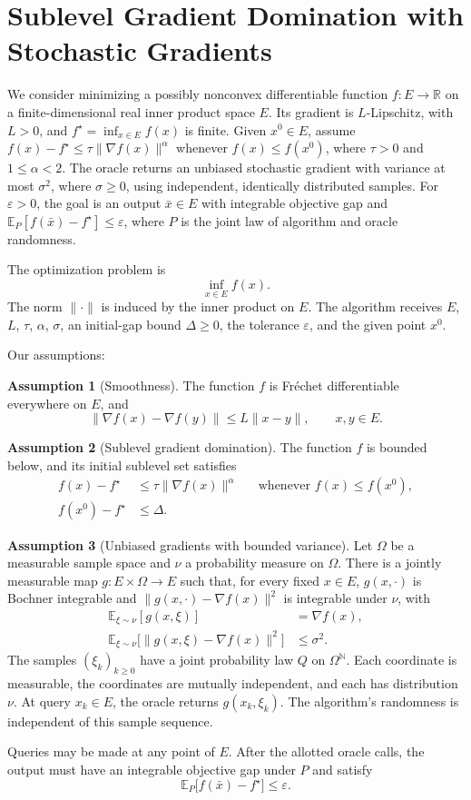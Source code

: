\documentclass[10pt]{article}
\theoremstyle{definition}
\newtheorem{assumption}{Assumption}
\begin{document}
\section*{Sublevel Gradient Domination with Stochastic Gradients}
We consider minimizing a possibly nonconvex differentiable function $f:E\to\mathbb{R}$ on a finite-dimensional real inner product space $E$. Its gradient is $L$-Lipschitz, with $L>0$, and $f^\star=\inf_{x\in E}f(x)$ is finite. Given $x^0\in E$, assume $f(x)-f^\star\leq\tau\|\nabla f(x)\|^\alpha$ whenever $f(x)\leq f(x^0)$, where $\tau>0$ and $1\leq\alpha<2$. The oracle returns an unbiased stochastic gradient with variance at most $\sigma^2$, where $\sigma\geq0$, using independent, identically distributed samples. For $\varepsilon>0$, the goal is an output $\bar{x}\in E$ with integrable objective gap and $\mathbb{E}_{P}[f(\bar{x})-f^\star]\leq\varepsilon$, where $P$ is the joint law of algorithm and oracle randomness.

The optimization problem is
\[
\inf_{x\in E} f(x).
\]
The norm $\|\cdot\|$ is induced by the inner product on $E$. The algorithm receives $E$, $L$, $\tau$, $\alpha$, $\sigma$, an initial-gap bound $\Delta\geq0$, the tolerance $\varepsilon$, and the given point $x^0$.

Our assumptions:
\begin{assumption}[Smoothness]
The function $f$ is Fr\'echet differentiable everywhere on $E$, and
\[
\|\nabla f(x)-\nabla f(y)\|\leq L\|x-y\|,
\qquad x,y\in E.
\]
\end{assumption}

\begin{assumption}[Sublevel gradient domination]
The function $f$ is bounded below, and its initial sublevel set satisfies
\[
\begin{aligned}
f(x)-f^\star&\leq\tau\|\nabla f(x)\|^\alpha
&&\text{whenever }f(x)\leq f(x^0),\\
f(x^0)-f^\star&\leq\Delta.
\end{aligned}
\]
\end{assumption}

\begin{assumption}[Unbiased gradients with bounded variance]
Let $\Omega$ be a measurable sample space and $\nu$ a probability measure on $\Omega$. There is a jointly measurable map $g:E\times\Omega\to E$ such that, for every fixed $x\in E$, $g(x,\cdot)$ is Bochner integrable and $\|g(x,\cdot)-\nabla f(x)\|^2$ is integrable under $\nu$, with
\[
\begin{aligned}
\mathbb{E}_{\xi\sim\nu}[g(x,\xi)]&=\nabla f(x),\\
\mathbb{E}_{\xi\sim\nu}
\bigl[\|g(x,\xi)-\nabla f(x)\|^2\bigr]&\leq\sigma^2.
\end{aligned}
\]
The samples $(\xi_k)_{k\geq0}$ have a joint probability law $Q$ on $\Omega^{\mathbb{N}}$. Each coordinate is measurable, the coordinates are mutually independent, and each has distribution $\nu$. At query $x_k\in E$, the oracle returns $g(x_k,\xi_k)$. The algorithm's randomness is independent of this sample sequence.
\end{assumption}

Queries may be made at any point of $E$. After the allotted oracle calls, the output must have an integrable objective gap under $P$ and satisfy
\[
\mathbb{E}_{P}\bigl[f(\bar{x})-f^\star\bigr]\leq\varepsilon.
\]
\end{document}
